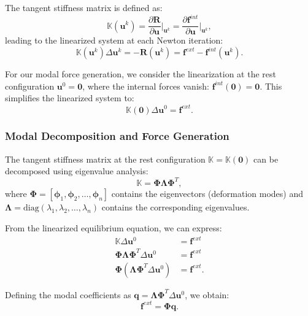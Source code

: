 The tangent stiffness matrix is defined as:
\begin{equation}
    \mathbb{K}(\bm{u}^k) = \frac{\partial \bm{R}}{\partial \bm{u}}\bigg|_{\bm{u}^k} = \frac{\partial \bm{f}^{int}}{\partial \bm{u}}\bigg|_{\bm{u}^k},
\end{equation}
leading to the linearized system at each Newton iteration:
\begin{equation}
    \mathbb{K}(\bm{u}^k) \Delta\bm{u}^k = -\bm{R}(\bm{u}^k) = \bm{f}^{ext} - \bm{f}^{int}(\bm{u}^k).
\end{equation}

For our modal force generation, we consider the linearization at the rest configuration $\bm{u}^0 = \bm{0}$, where the internal forces vanish: $\bm{f}^{int}(\bm{0}) = \bm{0}$. This simplifies the linearized system to:
\begin{equation}
    \mathbb{K}(\bm{0}) \Delta\bm{u}^0 = \bm{f}^{ext}.
\end{equation}

\subsubsection{Modal Decomposition and Force Generation}

The tangent stiffness matrix at the rest configuration $\mathbb{K} = \mathbb{K}(\bm{0})$ can be decomposed using eigenvalue analysis:
\begin{equation}
    \mathbb{K} = \boldsymbol{\Phi} \boldsymbol{\Lambda} \boldsymbol{\Phi}^T,
\end{equation}
where $\boldsymbol{\Phi} = [\bm{\phi}_1, \bm{\phi}_2, \ldots, \bm{\phi}_n]$ contains the eigenvectors (deformation modes) and $\boldsymbol{\Lambda} = \text{diag}(\lambda_1, \lambda_2, \ldots, \lambda_n)$ contains the corresponding eigenvalues.

From the linearized equilibrium equation, we can express:
\begin{align}
    \mathbb{K} \Delta\bm{u}^0 &= \bm{f}^{ext} \\
    \boldsymbol{\Phi} \boldsymbol{\Lambda} \boldsymbol{\Phi}^T \Delta\bm{u}^0 &= \bm{f}^{ext} \\
    \boldsymbol{\Phi} (\boldsymbol{\Lambda} \boldsymbol{\Phi}^T \Delta\bm{u}^0) &= \bm{f}^{ext}.
\end{align}

Defining the modal coefficients as $\bm{q} = \boldsymbol{\Lambda} \boldsymbol{\Phi}^T \Delta\bm{u}^0$, we obtain:
\begin{equation}
    \bm{f}^{ext} = \boldsymbol{\Phi} \bm{q}.
\end{equation}

